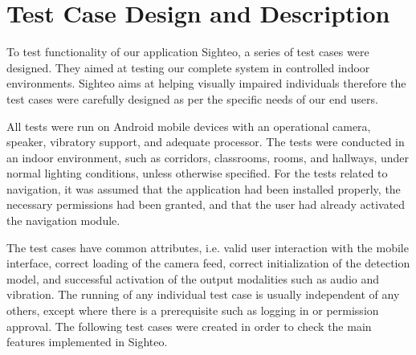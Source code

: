 \documentclass{FastFyp}
\begin{document}
\section{Test Case Design and Description}

To test functionality of our application Sighteo, a series of test cases were designed. They aimed at testing our complete system in controlled indoor environments. Sighteo aims at helping visually impaired individuals therefore the test cases were carefully designed as per the specific needs of our end users.

All tests were run on Android mobile devices with an operational camera, speaker, vibratory support, and adequate processor. The tests were conducted in an indoor environment, such as corridors, classrooms, rooms, and hallways, under normal lighting conditions, unless otherwise specified. For the tests related to navigation, it was assumed that the application had been installed properly, the necessary permissions had been granted, and that the user had already activated the navigation module.

The test cases have common attributes, i.e. valid user interaction with the mobile interface, correct loading of the camera feed, correct initialization of the detection model, and successful activation of the output modalities such as audio and vibration. The running of any individual test case is usually independent of any others, except where there is a prerequisite such as logging in or permission approval. The following test cases were created in order to check the main features implemented in Sighteo.
\end{document}

